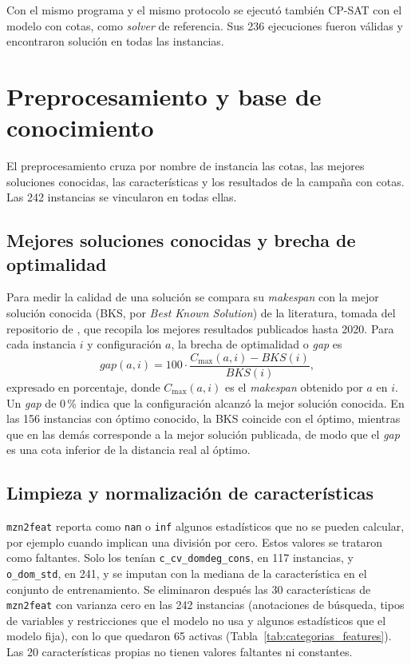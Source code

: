 Con el mismo programa y el mismo protocolo se ejecutó también CP-SAT con el
modelo con cotas, como \textit{solver} de referencia. Sus 236 ejecuciones
fueron válidas y encontraron solución en todas las instancias.

\section{Preprocesamiento y base de conocimiento}
\label{sec:preprocesamiento}

El preprocesamiento cruza por nombre de instancia las cotas, las mejores
soluciones conocidas, las características y los resultados de la campaña con
cotas. Las 242 instancias se vincularon en todas ellas.

\subsection{Mejores soluciones conocidas y brecha de optimalidad}
\label{sec:bks_gap}

Para medir la calidad de una solución se compara su \textit{makespan} con la
mejor solución conocida (BKS, por \textit{Best Known Solution}) de la
literatura, tomada del repositorio de \citet{weise2019jssp}, que recopila los
mejores resultados publicados hasta 2020. Para cada instancia $i$ y
configuración $a$, la brecha de optimalidad o \textit{gap} es
\begin{equation}
  \mathit{gap}(a,i) = 100 \cdot \frac{C_{\max}(a,i) - \mathit{BKS}(i)}{\mathit{BKS}(i)},
  \label{eq:gap}
\end{equation}
expresado en porcentaje, donde $C_{\max}(a,i)$ es el \textit{makespan}
obtenido por $a$ en $i$. Un \textit{gap} de 0\,\% indica que la configuración
alcanzó la mejor solución conocida. En las 156 instancias con óptimo
conocido, la BKS coincide con el óptimo, mientras que en las demás corresponde
a la mejor solución publicada, de modo que el \textit{gap} es una cota inferior
de la distancia real al óptimo.

\subsection{Limpieza y normalización de características}
\label{sec:limpieza}

\texttt{mzn2feat} reporta como \texttt{nan} o \texttt{inf} algunos
estadísticos que no se pueden calcular, por ejemplo cuando implican una
división por cero. Estos valores se trataron como faltantes. Solo los tenían
\texttt{c\_cv\_domdeg\_cons}, en 117 instancias, y \texttt{o\_dom\_std}, en
241, y se imputan con la mediana de la característica en el conjunto de
entrenamiento. Se eliminaron después las 30 características de
\texttt{mzn2feat} con varianza cero en las 242 instancias (anotaciones de
búsqueda, tipos de variables y restricciones que el modelo no usa y algunos
estadísticos que el modelo fija), con lo que quedaron 65 activas
(Tabla~\ref{tab:categorias_features}). Las 20 características propias no
tienen valores faltantes ni constantes.

